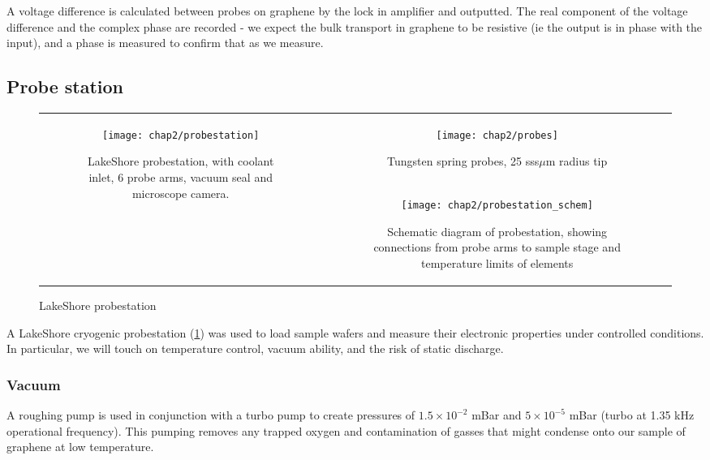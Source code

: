 \documentclass[../../Matt_Gebert_Honours_Thesis.tex]{subfiles}
\begin{document}
	A voltage difference is calculated between probes on graphene by the lock in amplifier and outputted. The real component of the voltage difference and the complex phase are recorded - we expect the bulk transport in graphene to be resistive (ie the output is in phase with the input), and a phase is measured to confirm that as we measure.
	
	\subsection{Probe station}\label{sec:probestation}
	\begin{figure}[H]
		\centering
		\begin{tabular}[b]{cc}
			\multirow{2}{*}[1.5cm]{
				\centering
				\begin{subfigure}{0.55\textwidth}
					\centering
					\texttt{[image: chap2/probestation]}
					\caption{LakeShore probestation, with coolant inlet, 6 probe arms, vacuum seal and microscope camera.}
				\end{subfigure}
			}
			&\begin{subfigure}{0.4\textwidth}
				\centering
				\texttt{[image: chap2/probes]}
				\caption{Tungsten spring probes, 25 sss$\mu$m radius tip}
			\end{subfigure}\vspace{0.5cm}\\
			&\begin{subfigure}[b]{0.4\textwidth}
				\texttt{[image: chap2/probestation\_schem]}
				\caption[Schematic diagram of probestation]{Schematic diagram of probestation, showing connections from probe arms to sample stage and temperature limits of elements}
			\end{subfigure}\\
		\end{tabular}
		\caption[LakeShore Probestation]{LakeShore probestation}\label{fig:probestation}
	\end{figure}
	A LakeShore cryogenic probestation (\cref{fig:probestation}) was used to load sample wafers and measure their electronic properties under controlled conditions. In particular, we will touch on temperature control, vacuum ability, and the risk of static discharge.
	
	\subsubsection{Vacuum}
	A roughing pump is used in conjunction with a turbo pump to create pressures of $1.5\times10^{-2}$ mBar and $5\times10^{-5}$ mBar (turbo at 1.35 kHz operational frequency). %
	This pumping removes any trapped oxygen and contamination of gasses that might condense onto our sample of graphene at low temperature.
	
\end{document}
